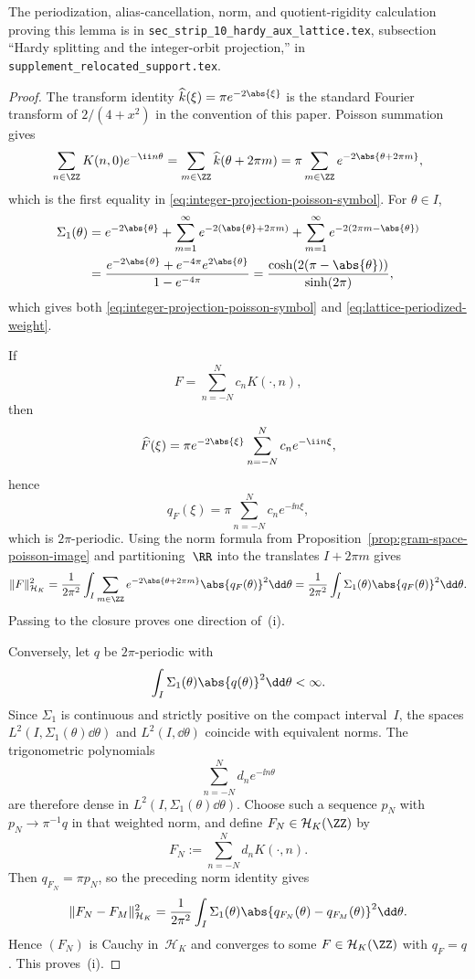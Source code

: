 \ifdefined\JFAArticleMain
The periodization, alias-cancellation, norm, and quotient-rigidity
calculation proving this lemma is in
\texttt{sec\_strip\_10\_hardy\_aux\_lattice.tex}, subsection ``Hardy splitting
and the integer-orbit projection,'' in
\texttt{supplement\_relocated\_support.tex}.
\else
\begin{proof}
The transform identity
\(\widehat k(\xi)=\pi e^{-2\abs{\xi}}\) is the standard Fourier transform
of \(2/(4+x^2)\) in the convention of this paper.  Poisson summation gives
\[
\sum_{n\in\ZZ}K(n,0)e^{-\ii n\theta}
=\sum_{m\in\ZZ}\widehat k(\theta+2\pi m)
=\pi\sum_{m\in\ZZ}e^{-2\abs{\theta+2\pi m}},
\]
which is the first equality in \eqref{eq:integer-projection-poisson-symbol}.
For $\theta\in I$,
\begin{align*}
\Sigma_1(\theta)
&=e^{-2\abs{\theta}}
+\sum_{m=1}^{\infty}e^{-2(\abs{\theta}+2\pi m)}
+\sum_{m=1}^{\infty}e^{-2(2\pi m-\abs{\theta})} \\
&=\frac{e^{-2\abs{\theta}}+e^{-4\pi}e^{2\abs{\theta}}}{1-e^{-4\pi}}
=\frac{\cosh(2(\pi-\abs{\theta}))}{\sinh(2\pi)},
\end{align*}
which gives both \eqref{eq:integer-projection-poisson-symbol} and
\eqref{eq:lattice-periodized-weight}.

If
\[
F=\sum_{n=-N}^{N}c_nK(\cdot,n),
\]
then
\[
\widehat F(\xi)=\pi e^{-2\abs{\xi}}\sum_{n=-N}^{N}c_ne^{-\ii n\xi},
\]
hence
\[
q_F(\xi)=\pi\sum_{n=-N}^{N}c_ne^{-\ii n\xi},
\]
which is $2\pi$-periodic.  Using the norm formula from
Proposition~\ref{prop:gram-space-poisson-image} and partitioning~$\RR$
into the translates $I+2\pi m$ gives
\[
\|F\|_{\mathcal H_K}^2
=\frac{1}{2\pi^2}\int_I
\sum_{m\in\ZZ}e^{-2\abs{\theta+2\pi m}}\abs{q_F(\theta)}^2\dd\theta
=\frac{1}{2\pi^2}\int_I\Sigma_1(\theta)\abs{q_F(\theta)}^2\dd\theta.
\]
Passing to the closure proves one direction of~(i).

Conversely, let $q$ be $2\pi$-periodic with
\[
\int_I\Sigma_1(\theta)\abs{q(\theta)}^2\dd\theta<\infty.
\]
Since $\Sigma_1$ is continuous and strictly positive on the compact
interval~$I$, the spaces
$L^2(I,\Sigma_1(\theta)\dd\theta)$ and $L^2(I,\dd\theta)$ coincide with
equivalent norms.  The trigonometric polynomials
\[
\sum_{n=-N}^{N}d_ne^{-\ii n\theta}
\]
are therefore dense in $L^2(I,\Sigma_1(\theta)\dd\theta)$.  Choose such a
sequence $p_N$ with $p_N\to \pi^{-1}q$ in that weighted norm, and define
$F_N\in\mathcal H_K(\ZZ)$ by
\[
F_N:=\sum_{n=-N}^{N}d_nK(\cdot,n).
\]
Then $q_{F_N}=\pi p_N$, so the preceding norm identity gives
\[
\|F_N-F_M\|_{\mathcal H_K}^2
=\frac{1}{2\pi^2}\int_I\Sigma_1(\theta)
\abs{q_{F_N}(\theta)-q_{F_M}(\theta)}^2\dd\theta.
\]
Hence $(F_N)$ is Cauchy in~$\mathcal H_K$ and converges to some
$F\in\mathcal H_K(\ZZ)$ with $q_F=q$.  This proves~(i).


\end{proof}
